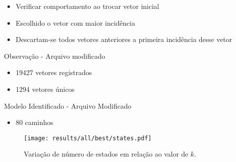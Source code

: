 \begin{frame}
\begin{itemize}
\item Verificar comportamento ao trocar vetor inicial \pause
\item Escolhido o vetor com maior incidência\pause
\item Descartam-se todos vetores anteriores a primeira incidência desse vetor
\end{itemize}
\end{frame}

\begin{frame}{Observação - Arquivo modificado}
\begin{itemize}
\item 19427 vetores registrados
\item 1294 vetores únicos
\end{itemize}
\end{frame}

\begin{frame}{Modelo Identificado - Arquivo Modificado}
\begin{itemize}
\item 80 caminhos 
\end{itemize}
\begin{figure}[H]
  \centering
  \texttt{[image: results/all/best/states.pdf]}
  \caption{Variação de número de estados em relação ao valor de $k$.}
    \label{fig:statesIdentOriginal}
\end{figure}
\end{frame}

